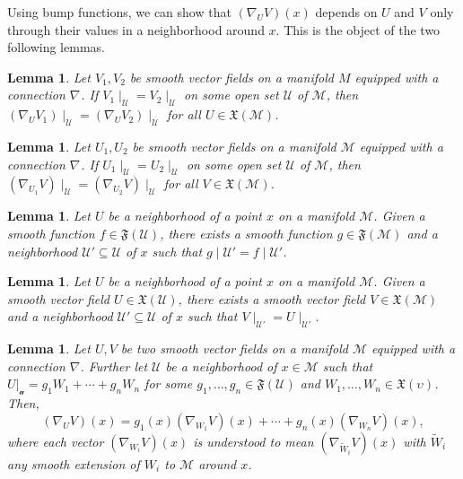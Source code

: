 \documentclass{article}
\theoremstyle{plain}
\newtheorem{lemma}[theorem]{Lemma}
\theoremstyle{definition}
\newcommand{\VecF}[1]{\mathfrak{X}(\mathcal{#1})}
\newcommand{\SmFunc}[1]{\mathfrak{F}(\mathcal{#1})}
\newcommand{\Conn}[3]{#1\nabla_{#2}{#3}}
\def\calM{\mathcal{M}}
\def\calU{\mathcal{U}}
\begin{document}
\noindent Using bump functions, we can show that $(\nabla_UV)(x)$ depends on $U$ and $V$ only through their values in a neighborhood around $x$. This is the object of the two following lemmas.

\begin{lemma}
Let $V_1, V_2$ be smooth vector fields on a manifold $M$ equipped with a connection $\Conn{}{}{}$. If $V_1 \mid_\calU = V_2 \mid_\calU$ on some open set $\calU$ of $\calM$, then $(\Conn{}{U}{V_1})\mid_\calU = (\Conn{}{U}{V_2})\mid_\calU$ for all $U \in \mathfrak{X}(\calM)$.
\end{lemma}

\begin{lemma}
Let $U_1, U_2$ be smooth vector fields on a manifold $\calM$ equipped with a connection $\Conn{}{}{}$. If $U_1\mid_\calU = U_2\mid_\calU$ on some open set $\calU$ of $\calM$, then $(\Conn{}{U_1}{V})\mid_\calU = (\Conn{}{U_2}{V})\mid_\calU$ for all $V \in \VecF{M}$.
\end{lemma}

\begin{lemma}
Let $U$ be a neighborhood of a point $x$ on a manifold $\calM$. 
Given a smooth function $f\in \SmFunc{U}$, there exists a smooth function $g\in \SmFunc{M}$ and a neighborhood $\calU' \subseteq \calU$ of $x$ such that $g\mid \calU' = f\mid\calU'$. 
\end{lemma}

\begin{lemma}
Let $U$ be a neighborhood of a point $x$ on a manifold $\calM$. 
Given a smooth vector field $U \in \VecF{U}$, there exists a smooth vector field $V \in \VecF{M}$ and a neighborhood $\calU' \subseteq \calU$ of $x$ 
such that $V\mid_{\calU'} = U\mid_{\calU'}$.
\end{lemma}

\begin{lemma}
Let $ U, V $ be two smooth vector fields on a manifold $\mathcal{M} $ equipped with a connection $ \nabla $. Further let $ \mathcal{U} $ be a neighborhood of $ x \in \mathcal{M}$ such that $ U|_{\mathcal{u}} = g_1W_1 + \cdots + g_n W_n $ for some $ g_1, \dots, g_n \in \mathfrak{F}(\mathcal{U}) $ and $ W_1, \dots, W_n \in \mathfrak{X}(\upsilon) $. 
Then,
$$(\nabla_U V)(x) = g_1(x)(\nabla_{W_1}V)(x) + \cdots + g_n(x)(\nabla_{W_n}V)(x),$$
where each vector $ (\nabla_{W_i}V)(x) $ is understood to mean $ (\nabla_{\widetilde{W}_i}V)(x) $ with $ \widetilde{W}_i $ any smooth extension of $ W_i $ to $ \mathcal{M} $ around $ x $.
\end{lemma}
\end{document}
